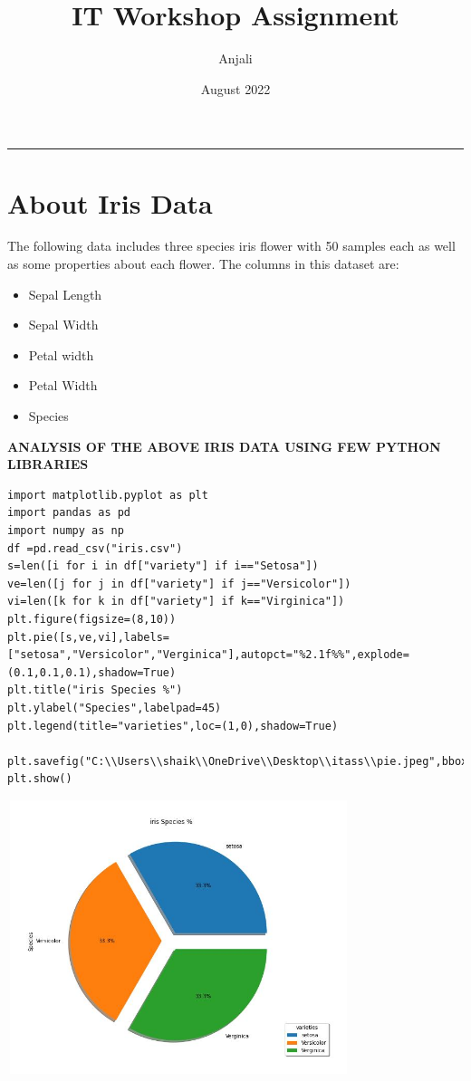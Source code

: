 \documentclass[12pt,a4paper]{article}
\title{IT Workshop Assignment }
\author{Anjali}
\affil{B192589}
\affil{CSE-C1}
\date{August 2022}
\begin{document}
\maketitle\vskip-15pt\hrule\vskip15pt


\section{About Iris Data}
The following data includes three species iris flower with 50 samples each as well as
some properties about each flower.
The columns in this dataset are:
\begin{itemize}
\color{brown}
\item Sepal Length
\color{red}
\item Sepal Width
\color{cyan}
\item Petal width
\color{lime}
\item Petal Width
\color{teal}
\item Species
\end{itemize}

\textbf{ANALYSIS OF THE ABOVE IRIS DATA USING FEW PYTHON LIBRARIES}



\begin{verbatim}
import matplotlib.pyplot as plt
import pandas as pd
import numpy as np
df =pd.read_csv("iris.csv")
s=len([i for i in df["variety"] if i=="Setosa"])
ve=len([j for j in df["variety"] if j=="Versicolor"])
vi=len([k for k in df["variety"] if k=="Virginica"])
plt.figure(figsize=(8,10))
plt.pie([s,ve,vi],labels=["setosa","Versicolor","Verginica"],autopct="%2.1f%%",explode=(0.1,0.1,0.1),shadow=True)
plt.title("iris Species %")
plt.ylabel("Species",labelpad=45)
plt.legend(title="varieties",loc=(1,0),shadow=True)

plt.savefig("C:\\Users\\shaik\\OneDrive\\Desktop\\itass\\pie.jpeg",bbox_inches="tight",pad_inches=0.5)
plt.show()
\end{verbatim}

\includegraphics[width=10cm, height=8cm]{pie.jpeg}
\end{document}
